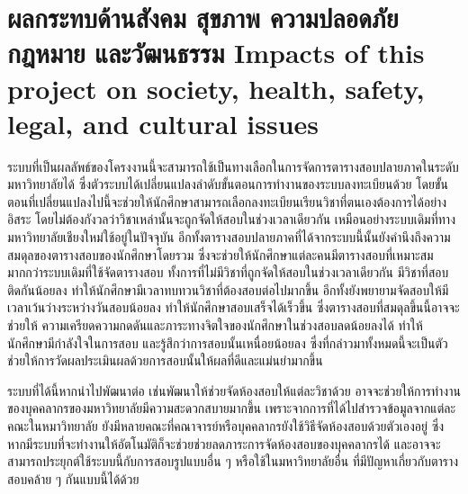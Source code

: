 \section{\ifcpe%
ผลกระทบด้านสังคม สุขภาพ ความปลอดภัย กฎหมาย และวัฒนธรรม
\else%
Impacts of this project on society, health, safety, legal, and cultural issues
\fi}

ระบบที่เป็นผลลัพธ์ของโครงงานนี้จะสามารถใช้เป็นทางเลือกในการจัดการตารางสอบปลายภาคในระดับมหาวิทยาลัยได้
ซึ่งตัวระบบได้เปลี่ยนแปลงลำดับขั้นตอนการทำงานของระบบลงทะเบียนด้วย โดยขั้นตอนที่เปลี่ยนแปลงไปนี้จะช่วยให้นักศึกษาสามารถเลือกลงทะเบียนเรียนวิชาที่ตนเองต้องการได้อย่างอิสระ 
โดยไม่ต้องกังวลว่าวิชาเหล่านั้นจะถูกจัดให้สอบในช่วงเวลาเดียวกัน เหมือนอย่างระบบเดิมที่ทางมหาวิทยาลัยเชียงใหม่ใช้อยู่ในปัจจุบัน
อีกทั้งตารางสอบปลายภาคที่ได้จากระบบนี้นั้นยังคำนึงถึงความสมดุลของตารางสอบของนักศึกษาโดยรวม ซึ่งจะช่วยให้นักศึกษาแต่ละคนมีตารางสอบที่เหมาะสมมากกว่าระบบเดิมที่ใช้จัดตารางสอบ
ทั้งการที่ไม่มีวิชาที่ถูกจัดให้สอบในช่วงเวลาเดียวกัน มีวิชาที่สอบติดกันน้อยลง ทำให้นักศึกษามีเวลาทบทวนวิชาที่ต้องสอบต่อไปมากขึ้น อีกทั้งยังพยายามจัดสอบให้มีเวลาเว้นว่างระหว่างวันสอบน้อยลง
ทำให้นักศึกษาสอบเสร็จได้เร็วขึ้น ซึ่งตารางสอบที่สมดุลขึ้นนี้อาจจะช่วยให้ ความเครียดความกดดันและภาระทางจิตใจของนักศึกษาในช่วงสอบลดน้อยลงได้ ทำให้นักศึกษามีกำลังใจในการสอบ และรู้สึกว่าการสอบนั้นเหนื่อยน้อยลง
ซึ่งที่กล่าวมาทั้งหมดนี้จะเป็นตัวช่วยให้การวัดผลประเมินผลด้วยการสอบนั้นให้ผลที่ดีและแม่นยำมากขึ้น


ระบบที่ได้นี้หากนำไปพัฒนาต่อ เช่นพัฒนาให้ช่วยจัดห้องสอบให้แต่ละวิชาด้วย อาจจะช่วยให้การทำงานของบุคคลากรของมหาวิทยาลัยมีความสะดวกสบายมากขึ้น 
เพราะจากการที่ได้ไปสำรวจข้อมูลจากแต่ละคณะในหมาวิทยาลัย ยังมีหลายคณะที่คณาจารย์หรือบุคคลากรยังใช้วิธีจัดห้องสอบด้วยตัวเองอยู่ 
ซึ่งหากมีระบบที่จะทำงานให้อัตโนมัติก็จะช่วยช่วยลดภาระการจัดห้องสอบของบุคคลากรได้ และอาจจะสามารถประยุกต์ใช้ระบบนี้กับการสอบรูปแบบอื่น ๆ หรือใช้ในมหาวิทยาลัยอื่น ที่มีปัญหาเกี่ยวกับตารางสอบคล้าย ๆ กันแบบนี้ได้ด้วย
